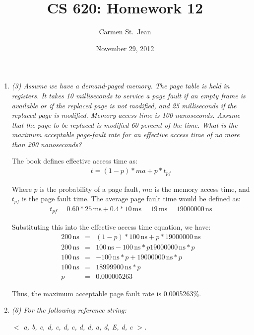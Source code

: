\documentclass[letterpaper,11pt]{article}
\newcommand{\unit}[1]{\ensuremath{\, \mathrm{#1}}}
\begin{document}
\title{CS 620: Homework 12}
\date{November 29, 2012}
\author{Carmen St.\ Jean}

\maketitle

\begin{enumerate}
\item \emph{(3) Assume we have a demand-paged memory. The page table is held in registers. It takes 10 milliseconds to service a page fault if an empty frame is available or if the replaced page is not modified, and 25 milliseconds if the replaced page is modified. Memory access time is 100 nanoseconds. Assume that the page to be replaced is modified 60 percent of the time. What is the maximum acceptable page-fault rate for an effective access time of no more than 200 nanoseconds?}

The book defines effective access time as:
\begin{eqnarray*}
    t = (1 - p) * ma + p * t_{pf}
\end{eqnarray*}

Where $p$ is the probability of a page fault, $ma$ is the memory access time, and $t_{pf}$ is the page fault time.  The average page fault time would be defined as:
\begin{eqnarray*}
    t_{pf} = 0.60 * 25 \unit{ ms} + 0.4 * 10 \unit{ ms} = 19 \unit{ ms} = 19000000 \unit{ ns}
\end{eqnarray*}

Substituting this into the effective access time equation, we have:
\begin{eqnarray*}
    200 \unit{ ns} &=& (1 - p) * 100 \unit{ ns} + p * 19000000 \unit{ns} \\
    200 \unit{ ns} &=& 100 \unit{ ns} - 100 \unit{ ns} * p 19000000 \unit{ns} * p \\
    100 \unit{ ns} &=& -100 \unit{ ns} * p + 19000000 \unit{ns} * p \\
    100 \unit{ ns} &=& 18999900 \unit{ns} * p \\
                 p &=& 0.000005263
\end{eqnarray*}

Thus, the maximum acceptable page fault rate is 0.0005263\%.

\item \emph{(6) For the following reference string:}

\emph{$<$ a, b, c, d, c, d, c, d, d, a, d, E, d, c $>$.}


\end{enumerate}
\end{document}
